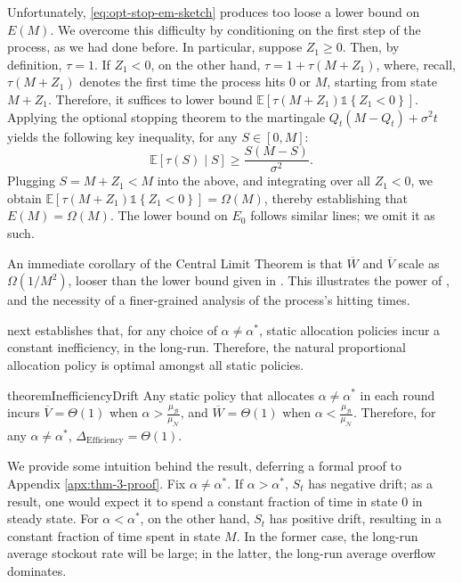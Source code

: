 \documentclass[mnsc,nonblindrev]{informs3}
\newcommand{\E}{\mathbb{E}}
\newcommand{\NDist}{\mathcal{N}}
\newcommand{\BDist}{\mathcal{B}}
\newcommand{\Nmean}{\mu_{\NDist}}
\newcommand{\Bmean}{\mu_{\BDist}}
\newcommand{\ind}[1]{\mathds{1}\left\{#1\right\}}
\newcommand{\Deff}{\Delta_{\text{Efficiency}}\xspace}
\renewenvironment{proof}[1][Proof]{%
  \par\noindent{\itshape #1.} \ignorespaces
}{%
  \hfill\Halmos\par
}
\begin{document}
\begin{proof}[Proof sketch]
Unfortunately, \eqref{eq:opt-stop-em-sketch} produces too loose a lower bound on $E(M)$. We overcome this difficulty by conditioning on the first step of the process, as we had done before. In particular, suppose $Z_1 \geq 0$. Then, by definition, $\tau = 1$. If $Z_1 < 0$, on the other hand, $\tau = 1 + \tau(M+Z_1)$, where, recall, $\tau(M+Z_1)$ denotes the first time the process hits $0$ or $M$, starting from state $M+Z_1$. Therefore, it suffices to lower bound $\E[\tau(M+Z_{1})\ind{Z_1 < 0}]$. Applying the optional stopping theorem to the martingale $Q_t(M-Q_t) + \sigma^2 t$ yields the following key inequality, for any $S \in [0,M]$:
\[\E[\tau(S) \mid S] \geq \frac{S(M-S)}{\sigma^2}.\]
Plugging $S = M+Z_1 {< M}$ into the above, and integrating over all $Z_1 < 0$, we obtain $\E[\tau(M+Z_1)\ind{Z_1 < 0}] = \Omega(M)$, thereby establishing that $E(M) = \Omega(M)$. The lower bound on $E_0$ follows similar lines; we omit it as such.
\end{proof}


\begin{remark}
An immediate corollary of the Central Limit Theorem is that $\overline{W}$ and $\overline{V}$ scale as $\Omega(1/M^2)$, looser than the lower bound given in . This illustrates the power of , and the necessity of a finer-grained analysis of the process's hitting times. 
\end{remark}



 next establishes that, for any choice of $\alpha \neq \alpha^*$, static allocation policies incur a constant inefficiency, in the long-run. Therefore, the natural proportional allocation policy is optimal amongst all static policies.
\begin{restatable}{theorem}{InefficiencyDrift} 
\label{thm:Inefficient_for_fix_non-0_mean}
    {Any static policy that allocates $\alpha \neq \alpha^*$ in each round incurs}
    $\overline{V} = \Theta(1)$ when
  $\alpha > \frac{\Bmean}{\Nmean}$, and $\overline{W} = \Theta(1)$ when $\alpha < \frac{\Bmean}{\Nmean}$. Therefore, for any $\alpha \neq \alpha^*$, $\Deff = \Theta(1)$.   
\end{restatable}

We provide some intuition behind the result, deferring a formal proof to Appendix \ref{apx:thm-3-proof}. Fix $\alpha \neq \alpha^*$. If $\alpha > \alpha^*$, $S_t$ has negative drift; as a result, one would expect it to spend a constant fraction of time in state 0 in steady state. For $\alpha < \alpha^*$, on the other hand, $S_t$ has positive drift, resulting in a constant fraction of time spent in state $M$. In the former case, the long-run average stockout rate will be large; in the latter, the long-run average overflow dominates.
\end{document}
